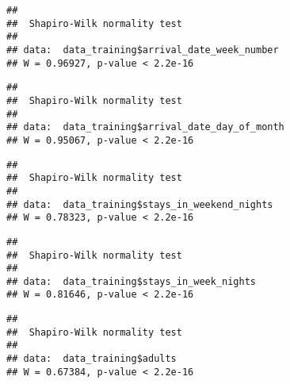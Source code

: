 \documentclass[]{article}
\newenvironment{Shaded}{\begin{snugshade}}{\end{snugshade}}
\newcommand{\KeywordTok}[1]{\textcolor[rgb]{0.13,0.29,0.53}{\textbf{#1}}}
\newcommand{\NormalTok}[1]{#1}
\newcommand{\OperatorTok}[1]{\textcolor[rgb]{0.81,0.36,0.00}{\textbf{#1}}}
\begin{document}
\begin{verbatim}
## 
##  Shapiro-Wilk normality test
## 
## data:  data_training$arrival_date_week_number
## W = 0.96927, p-value < 2.2e-16
\end{verbatim}

\begin{Shaded}
\end{Shaded}

\begin{verbatim}
## 
##  Shapiro-Wilk normality test
## 
## data:  data_training$arrival_date_day_of_month
## W = 0.95067, p-value < 2.2e-16
\end{verbatim}

\begin{Shaded}
\end{Shaded}

\begin{verbatim}
## 
##  Shapiro-Wilk normality test
## 
## data:  data_training$stays_in_weekend_nights
## W = 0.78323, p-value < 2.2e-16
\end{verbatim}

\begin{Shaded}
\end{Shaded}

\begin{verbatim}
## 
##  Shapiro-Wilk normality test
## 
## data:  data_training$stays_in_week_nights
## W = 0.81646, p-value < 2.2e-16
\end{verbatim}

\begin{Shaded}
\end{Shaded}

\begin{verbatim}
## 
##  Shapiro-Wilk normality test
## 
## data:  data_training$adults
## W = 0.67384, p-value < 2.2e-16
\end{verbatim}
\end{document}
